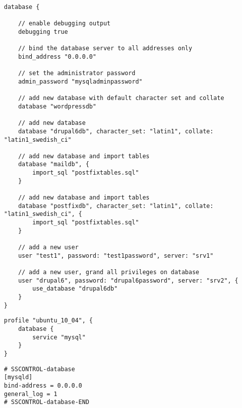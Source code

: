 
\begin{lstlisting}[style=Java,label=lst:database_example_script,
title={Example script for a database. It will set the database server address, create four databases and two users.}]
database {

    // enable debugging output
    debugging true

    // bind the database server to all addresses only
    bind_address "0.0.0.0"

    // set the administrator password
    admin_password "mysqladminpassword"

    // add new database with default character set and collate
    database "wordpressdb"

    // add new database
    database "drupal6db", character_set: "latin1", collate: "latin1_swedish_ci"

    // add new database and import tables
    database "maildb", {
        import_sql "postfixtables.sql"
    }

    // add new database and import tables
    database "postfixdb", character_set: "latin1", collate: "latin1_swedish_ci", {
        import_sql "postfixtables.sql"
    }

    // add a new user
    user "test1", password: "test1password", server: "srv1"

    // add a new user, grand all privileges on database
    user "drupal6", password: "drupal6password", server: "srv2", {
        use_database "drupal6db"
    }
}
\end{lstlisting}

\begin{lstlisting}[style=Java,label=lst:database_ubuntu_profile_min,
title={Minimal Ubuntu database profile, only the database type is needed. The other profile properties are set to default values.}]
profile "ubuntu_10_04", {
    database {
        service "mysql"
    }
}
\end{lstlisting}

\begin{lstlisting}[style=rcfile_nonumbers,
label=lst:database_maincf_example,
title={Example MySQL server configuration file that is created from the database profile.
The file is saved as /etc/mysql/conf.d/sscontrol\_mysqld.cnf}]
# SSCONTROL-database
[mysqld]
bind-address = 0.0.0.0
general_log = 1
# SSCONTROL-database-END
\end{lstlisting}

